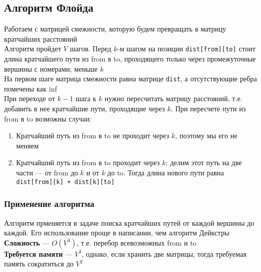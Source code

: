 \documentclass[a4paper]{article}
\newcommand{\code}[1]{\colorbox{codegray}{\texttt{#1}}}
\begin{document}
\subsection{Алгоритм Флойда}
Работаем с матрицей смежности, которую будем превращать в матрицу кратчайших расстояний\\[2mm]
\indent Алгоритм пройдет $V$ шагов. Перед $k$-м шагом на позиции \code{dist[from][to]} стоит длина кратчайшего пути из from в to, проходящего только через промежуточные вершины с номерами, меньше $k$\\[2mm]
\indent На первом шаге матрица смежности равна матрице \code{dist}, а отсутствующие ребра помечены как inf\\[2mm]
\indent При переходе от $k-1$ шага к $k$ нужно пересчитать матрицу расстояний, т.е. добавить в нее кратчайшие пути, проходящие через $k$. При пересчете пути из from в to возможны случаи:
\begin{enumerate}
    \item Кратчайший путь из from в to не проходит через $k$, поэтому мы его не меняем
    \item Кратчайший путь из from в to проходит через $k$: делим этот путь на две части — от from до $k$ и от $k$ до to. Тогда длина нового пути равна \code{dist[from][k] + dist[k][to]}
\end{enumerate}
\subsubsection*{Применение алгоритма}
Алгоритм прменяется в задаче поиска кратчайших путей от каждой вершины до каждой. Его использование проще в написании, чем алгоритм Дейкстры\\[2mm]
\indent\textbf{Сложность} — $O(V^3)$, т.е. перебор всевозможных from и to\\[2mm]
\indent\textbf{Требуется памяти} — $V^3$, однако, если хранить две матрицы, тогда требуемая память сократиться до $V^2$
\end{document}
